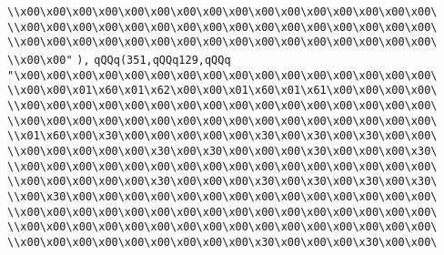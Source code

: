 \verb|\\x00\x00\x00\x00\x00\x00\x00\x00\x00\x00\x00\x00\x00\x00\x00\x00\|\newline
\verb|\\x00\x00\x00\x00\x00\x00\x00\x00\x00\x00\x00\x00\x00\x00\x00\x00\|\newline
\verb|\\x00\x00\x00\x00\x00\x00\x00\x00\x00\x00\x00\x00\x00\x00\x00\x00\|\newline
\verb|\\x00\x00"|\newline
\verb|),|\newline
\verb|qQQq(351,qQQq129,qQQq|\newline
\verb|"\x00\x00\x00\x00\x00\x00\x00\x00\x00\x00\x00\x00\x00\x00\x00\x00\|\newline
\verb|\\x00\x00\x01\x60\x01\x62\x00\x00\x01\x60\x01\x61\x00\x00\x00\x00\|\newline
\verb|\\x00\x00\x00\x00\x00\x00\x00\x00\x00\x00\x00\x00\x00\x00\x00\x00\|\newline
\verb|\\x00\x00\x00\x00\x00\x00\x00\x00\x00\x00\x00\x00\x00\x00\x00\x00\|\newline
\verb|\\x01\x60\x00\x30\x00\x00\x00\x00\x00\x30\x00\x30\x00\x30\x00\x00\|\newline
\verb|\\x00\x00\x00\x00\x00\x30\x00\x30\x00\x00\x00\x30\x00\x00\x00\x30\|\newline
\verb|\\x00\x00\x00\x00\x00\x00\x00\x00\x00\x00\x00\x00\x00\x00\x00\x00\|\newline
\verb|\\x00\x00\x00\x00\x00\x30\x00\x00\x00\x30\x00\x30\x00\x30\x00\x30\|\newline
\verb|\\x00\x30\x00\x00\x00\x00\x00\x00\x00\x00\x00\x00\x00\x00\x00\x00\|\newline
\verb|\\x00\x00\x00\x00\x00\x00\x00\x00\x00\x00\x00\x00\x00\x00\x00\x00\|\newline
\verb|\\x00\x00\x00\x00\x00\x00\x00\x00\x00\x00\x00\x00\x00\x00\x00\x00\|\newline
\verb|\\x00\x00\x00\x00\x00\x00\x00\x00\x00\x30\x00\x00\x00\x30\x00\x00\|\newline
